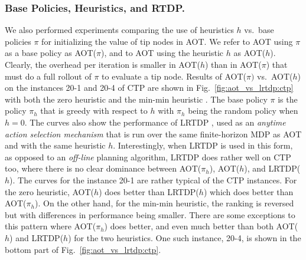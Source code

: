 \documentclass[letterpaper]{article}
\newcommand{\Omit}[1]{}
\begin{document}
\Omit{
and found that while the $\Delta$
It 
based on the computation of the $\Delta$'s, and
the use of base policies vs.\ heuristic values for
setting the values of tips in AOT. 
In principle, $\Delta$-based selection 
of tip nodes payoffs a lot in comparison with random tip
selection, when a base random policy is used, and less when informed
base policies are used instead  (Fig.~\ref{fig:ctp:selection:10-7}).
}




\subsubsection{Base Policies,  Heuristics, and RTDP.}
We also performed experiments comparing the use of heuristics $h$
vs.\ base policies $\pi$ for initializing the value of tip nodes in 
AOT. We  refer to AOT using $\pi$ as a base policy as AOT($\pi$),
and to  AOT using the heuristic $h$ as AOT($h$).
Clearly, the overhead per iteration is smaller in AOT($h$) than in AOT($\pi$)
that must do a full rollout of $\pi$ to evaluate a tip node. 
Results of AOT($\pi)$ vs.\ AOT($h$) on the instances 20-1 and 20-4 of CTP are shown
in Fig.~\ref{fig:aot_vs_lrtdp:ctp} with both the zero heuristic and the min-min heuristic
\cite{bonet:lrtdp}. The base policy $\pi$  is the policy $\pi_h$ 
that is greedy with respect to $h$ with $\pi_h$ being the random policy when $h=0$.
The curves also show the performance of LRTDP \cite{bonet:lrtdp},  used as an 
\emph{anytime action selection mechanism} that is run over the same finite-horizon MDP as AOT
and with the same heuristic $h$. Interestingly, when LRTDP is used in this form, 
as opposed to an \emph{off-line} planning algorithm, LRTDP does rather well on CTP too, 
where there is no clear dominance  between AOT($\pi_h$), AOT($h$), and LRTDP($h$). 
The curves for the instance 20-1 are rather typical of the CTP instances.
For the zero heuristic, AOT($h$) does  better  than LRTDP($h$) which does better
 than AOT($\pi_h$). On the other hand, for the min-min heuristic, the ranking 
 is  reversed but with differences in performance being smaller. 
There are  some exceptions to this pattern where AOT($\pi_h$) does
better, and even much better than  both  AOT($h$) and LRTDP($h$) for the two heuristics. 
One such instance, 20-4, is shown in the bottom part of  Fig.~\ref{fig:aot_vs_lrtdp:ctp}.
\end{document}
